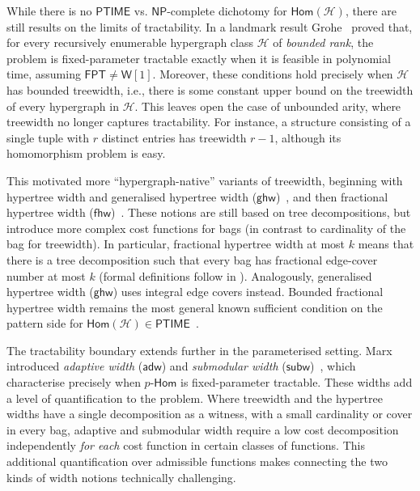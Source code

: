 \documentclass[11pt,letterpaper]{article}
\theoremstyle{definition}
\theoremstyle{remark}
\newcommand{\cH}{\mathcal H}
\newcommand{\Hom}{\mathsf{Hom}}
\newcommand{\pHom}{p\text{-}\mathsf{Hom}}
\newcommand{\ghw}{\mathsf{ghw}}
\newcommand{\fhw}{\mathsf{fhw}}
\newcommand{\adw}{\mathsf{adw}}
\newcommand{\subw}{\mathsf{subw}}
\newcommand{\FPT}{\ensuremath{\mathsf{FPT}}}
\newcommand{\PTIME}{\mathsf{PTIME}}
\newcommand{\NP}{\mathsf{NP}}
\newcommand{\wone}{\ensuremath{\mathsf{W}[1]}}
\providecommand{\adw}{\operatorname{adw}}
\providecommand{\subw}{\operatorname{subw}}
\providecommand{\fhw}{\operatorname{fhw}}
\providecommand{\FPT}{\ensuremath{\mathsf{FPT}}}
\providecommand{\PTIME}{\mathsf{PTIME}}
\begin{document}
While there is no $\PTIME$ vs. $\NP$-complete dichotomy for $\Hom(\cH)$, there are still results on the limits of tractability. In a landmark result Grohe~\cite{DBLP:journals/jacm/Grohe07} proved that, for every
recursively enumerable hypergraph class $\cH$ of \emph{bounded rank}, the problem is fixed-parameter tractable exactly when it is feasible in polynomial time, assuming
$\FPT\ne\wone$. Moreover, these conditions hold precisely when $\cH$ has bounded treewidth, i.e., there is some constant upper bound on the treewidth of every hypergraph in $\cH$.
%
This leaves open the case of unbounded arity, where treewidth no longer captures tractability. For instance, a structure consisting of a single tuple with $r$ distinct entries has treewidth $r-1$, although its homomorphism problem is easy.

This motivated more ``hypergraph-native'' variants of treewidth, beginning
with hypertree width and generalised hypertree
width ($\ghw$)~\cite{DBLP:journals/jcss/GottlobLS02}, and then fractional
hypertree width ($\fhw$)~\cite{fhw}.
These notions are still based on tree decompositions, but introduce more complex cost functions for bags (in contrast to cardinality of the bag for treewidth). In particular, fractional hypertree width at most $k$ means that there is a tree decomposition such that every bag has fractional edge-cover number at most $k$ (formal definitions follow in ). Analogously, generalised hypertree width ($\ghw$) uses integral edge covers instead.
Bounded fractional hypertree width
remains the most general known sufficient condition on the pattern
side for $\Hom(\cH)\in\PTIME$~\cite{fhw}.


The tractability boundary extends further in the parameterised setting.
Marx introduced \emph{adaptive width} ($\adw$) and \emph{submodular width} ($\subw$)~\cite{adw,Marx13}, which characterise precisely when $\pHom$ is fixed-parameter tractable.
These widths add a level of quantification to the problem. Where treewidth and the hypertree widths have a single decomposition as a witness, with a small cardinality or cover in every bag, adaptive and submodular width require a low cost decomposition independently \emph{for each} cost function in certain classes of functions. This additional quantification over admissible functions makes connecting the two kinds of width notions technically challenging.
\end{document}
